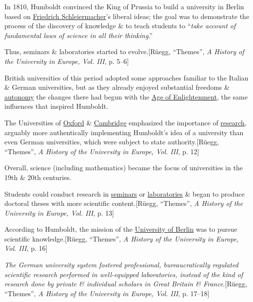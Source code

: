 \documentclass{article}
\begin{document}
In 1810, Humboldt convinced the King of Prussia to build a university in Berlin based on \href{https://en.wikipedia.org/wiki/Friedrich_Schleiermacher}{Friedrich Schleiermacher}'s liberal ideas; the goal was to demonstrate the process of the discovery of knowledge \& to teach students to ``\textit{take account of fundamental laws of science in all their thinking}.''

Thus, seminars \& laboratories started to evolve.[Rüegg, ``Themes'', \textit{A History of the University in Europe, Vol. III}, p. 5--6]

%
British universities of this period adopted some approaches familiar to the Italian \& German universities, but as they already enjoyed substantial freedoms \& \href{https://en.wikipedia.org/wiki/Autonomy}{autonomy} the changes there had begun with the \href{https://en.wikipedia.org/wiki/Age_of_Enlightenment}{Age of Enlightenment}, the same influences that inspired Humboldt.

The Universities of \href{https://en.wikipedia.org/wiki/University_of_Oxford}{Oxford} \& \href{https://en.wikipedia.org/wiki/University_of_Cambridge}{Cambridge} emphasized the importance of \href{https://en.wikipedia.org/wiki/Research}{research}, arguably more authentically implementing Humboldt's idea of a university than even German universities, which were subject to state authority.[Rüegg, ``Themes'', \textit{A History of the University in Europe, Vol. III}, p. 12]

Overall, science (including mathematics) became the focus of universities in the 19th \& 20th centuries.

Students could conduct research in \href{https://en.wikipedia.org/wiki/Seminars}{seminars} or \href{https://en.wikipedia.org/wiki/Laboratories}{laboratories} \& began to produce doctoral theses with more scientific content.[Rüegg, ``Themes'', \textit{A History of the University in Europe, Vol. III}, p. 13]

According to Humboldt, the mission of the \href{https://en.wikipedia.org/wiki/University_of_Berlin}{University of Berlin} was to pursue scientific knowledge.[Rüegg, ``Themes'', \textit{A History of the University in Europe, Vol. III}, p. 16]

\textit{The German university system fostered professional, bureaucratically regulated scientific research performed in well-equipped laboratories, instead of the kind of research done by private \& individual scholars in Great Britain \& France}.[Rüegg, ``Themes'', \textit{A History of the University in Europe, Vol. III}, p. 17--18]
\end{document}
